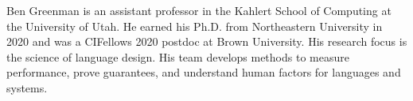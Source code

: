 \documentclass[11pt]{article}
\begin{document}

Ben Greenman is an assistant professor in the Kahlert School of Computing at
the University of Utah. He earned his Ph.D. from Northeastern University in
2020 and was a CIFellows 2020 postdoc at Brown University. His research focus
is the science of language design. His team develops methods to measure
performance, prove guarantees, and understand human factors for languages and
systems.
\end{document}
